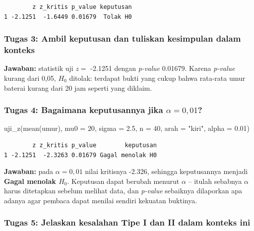 \documentclass[
  indonesian,
  letterpaper,
]{book}
\newenvironment{Shaded}{\begin{snugshade}}{\end{snugshade}}
\newcommand{\AttributeTok}[1]{\textcolor[rgb]{0.40,0.45,0.13}{#1}}
\newcommand{\DecValTok}[1]{\textcolor[rgb]{0.68,0.00,0.00}{#1}}
\newcommand{\FloatTok}[1]{\textcolor[rgb]{0.68,0.00,0.00}{#1}}
\newcommand{\FunctionTok}[1]{\textcolor[rgb]{0.28,0.35,0.67}{#1}}
\newcommand{\NormalTok}[1]{\textcolor[rgb]{0.00,0.23,0.31}{#1}}
\newcommand{\StringTok}[1]{\textcolor[rgb]{0.13,0.47,0.30}{#1}}
\begin{document}
\begin{verbatim}
        z z_kritis p_value keputusan
1 -2.1251  -1.6449 0.01679  Tolak H0
\end{verbatim}

\subsubsection{Tugas 3: Ambil keputusan dan tuliskan kesimpulan dalam
konteks}\label{tugas-3-ambil-keputusan-dan-tuliskan-kesimpulan-dalam-konteks}

\textbf{Jawaban:} statistik uji \(z =\) -2.1251 dengan \emph{p-value}
0.01679. Karena \emph{p-value} kurang dari 0,05, \(H_0\) ditolak:
terdapat bukti yang cukup bahwa rata-rata umur baterai kurang dari 20
jam seperti yang diklaim.

\subsubsection{\texorpdfstring{Tugas 4: Bagaimana keputusannya jika
\(\alpha = 0{,}01\)?}{Tugas 4: Bagaimana keputusannya jika \textbackslash alpha = 0\{,\}01?}}\label{tugas-4-bagaimana-keputusannya-jika-alpha-001}

\begin{Shaded}
\begin{Highlighting}[]
\FunctionTok{uji\_z}\NormalTok{(}\FunctionTok{mean}\NormalTok{(umur), }\AttributeTok{mu0 =} \DecValTok{20}\NormalTok{, }\AttributeTok{sigma =} \FloatTok{2.5}\NormalTok{, }\AttributeTok{n =} \DecValTok{40}\NormalTok{, }\AttributeTok{arah =} \StringTok{"kiri"}\NormalTok{, }\AttributeTok{alpha =} \FloatTok{0.01}\NormalTok{)}
\end{Highlighting}
\end{Shaded}

\begin{verbatim}
        z z_kritis p_value        keputusan
1 -2.1251  -2.3263 0.01679 Gagal menolak H0
\end{verbatim}

\textbf{Jawaban:} pada \(\alpha = 0{,}01\) nilai kritisnya -2.326,
sehingga keputusannya menjadi \textbf{Gagal menolak \(H_0\)}. Keputusan
dapat berubah menurut \(\alpha\) -- itulah sebabnya \(\alpha\) harus
ditetapkan sebelum melihat data, dan \emph{p-value} sebaiknya dilaporkan
apa adanya agar pembaca dapat menilai sendiri kekuatan buktinya.

\subsubsection{Tugas 5: Jelaskan kesalahan Tipe I dan II dalam konteks
ini}\label{tugas-5-jelaskan-kesalahan-tipe-i-dan-ii-dalam-konteks-ini}
\end{document}
